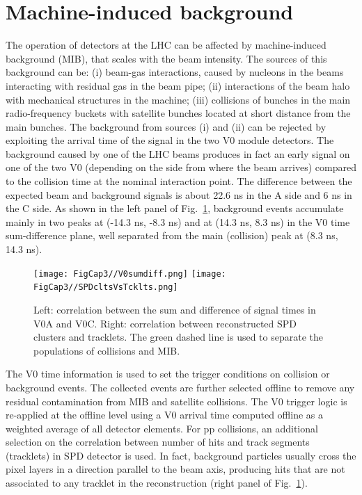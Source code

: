 \section{Machine-induced background}
\label{sec:BkgRejection}
The operation of detectors at the LHC can be affected by machine-induced
background (MIB), that scales with the beam intensity. The sources of this background can be: (i) beam-gas interactions,
caused by nucleons in the beams interacting with residual gas in the beam pipe;
(ii) interactions of the beam halo with mechanical structures in the machine; (iii)
collisions of bunches in the main radio-frequency buckets with satellite bunches located at short 
distance from the main bunches. 
The background from sources (i) and (ii) can be rejected by exploiting the arrival time of the signal in the two V0 module detectors.
The background caused by one of the LHC beams produces in fact an early
signal on one of the two V0 (depending on the side from where the beam arrives) 
compared to the collision time at the nominal interaction point.
The difference between the expected beam and background signals 
is about 22.6 ns in the A side and 6 ns in the C side. As shown in the left panel of Fig.~\ref{fig:V0sumdiff}, 
background events accumulate mainly in two peaks at (-14.3 ns, -8.3 ns)
and at (14.3 ns, 8.3 ns) in the V0 time sum-difference plane, 
well separated from the main (collision) peak at (8.3 ns, 14.3 ns). 
\begin{figure}[!h]
\centering
\texttt{[image: FigCap3//V0sumdiff.png]}
\texttt{[image: FigCap3//SPDcltsVsTcklts.png]}
\caption{Left: correlation between the sum and difference of signal times in 
V0A and V0C. Right: correlation between reconstructed SPD clusters and tracklets. The green dashed line is used to separate
the populations of collisions and MIB.}
\label{fig:V0sumdiff}
\end{figure}
The V0 time information is 
used to set the trigger conditions on collision or background events. 
The collected events are further selected offline to remove any residual
contamination from MIB and satellite collisions.
The V0 trigger logic is re-applied at the offline level using a V0 arrival time 
computed offline as a weighted average of all detector elements.
For pp collisions, an additional selection on the correlation
between number of hits and track segments (tracklets) in SPD detector is used.
In fact, background particles usually cross the pixel layers in a 
direction parallel to the beam axis, producing hits that are not associated 
to any tracklet in the reconstruction (right panel of Fig.~\ref{fig:V0sumdiff}).
